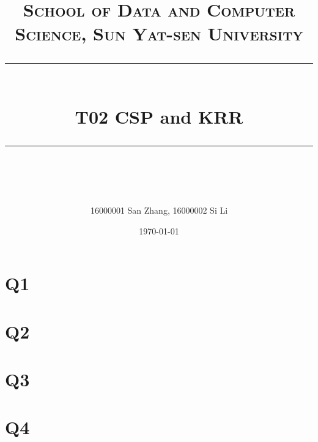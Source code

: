 ﻿\documentclass[a4paper, 11pt]{article}
\title{	
\normalfont \normalsize
\textsc{School of Data and Computer Science, Sun Yat-sen University} \\ [25pt] %
\rule{\textwidth}{0.5pt} \\[0.4cm] %
\huge  T02 CSP and KRR\\ %
\rule{\textwidth}{2pt} \\[0.5cm] %
\author{16000001 San Zhang, 16000002 Si Li}
\date{\normalsize\today}

}
\begin{document}
\maketitle
\tableofcontents
\newpage
\section{Q1}
\section{Q2}
\section{Q3}
\section{Q4}


%
%
\end{document}
